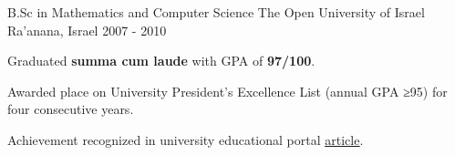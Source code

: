\begin{cventries}
  \cventry
    {B.Sc in Mathematics and Computer Science}
    {The Open University of Israel}
    {Ra'anana, Israel}
    {2007 - 2010}
    {
      \begin{cvitems}
        \item Graduated \textbf{summa cum laude} with GPA of \textbf{97/100}.
        \item Awarded place on University President's Excellence List (annual GPA ≥95) for four consecutive years.
        \item Achievement recognized in university educational portal \href{http://www.kav-lahinuch.co.il/?CategoryID=919&ArticleID=9023}{\color{awesome}\underline{article}}.
      \end{cvitems}
    }
\end{cventries}